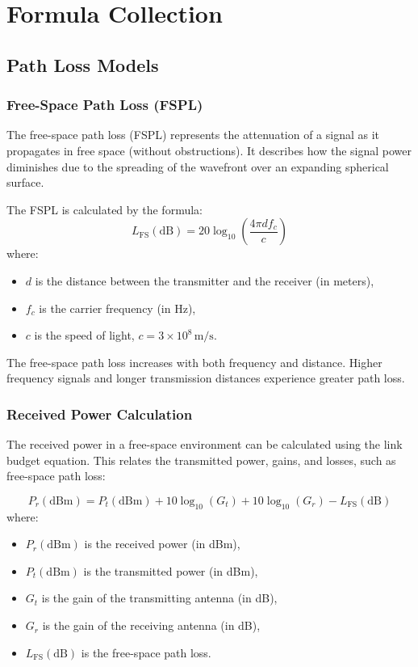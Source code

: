 \documentclass[a4paper,12pt]{book}
\begin{document}
	\chapter{Formula Collection}
	\section{Path Loss Models}
	
	\subsection{Free-Space Path Loss (FSPL)}
	The free-space path loss (FSPL) represents the attenuation of a signal as it propagates in free space (without obstructions). It describes how the signal power diminishes due to the spreading of the wavefront over an expanding spherical surface.
	
	The FSPL is calculated by the formula:
	\[
	L_{\text{FS}}(\text{dB}) = 20 \log_{10} \left( \frac{4\pi d f_c}{c} \right)
	\]
	where:
	\begin{itemize}
		\item \( d \) is the distance between the transmitter and the receiver (in meters),
		\item \( f_c \) is the carrier frequency (in Hz),
		\item \( c \) is the speed of light, \(c = 3 \times 10^8 \, \text{m/s}\).
	\end{itemize}
	
	The free-space path loss increases with both frequency and distance. Higher frequency signals and longer transmission distances experience greater path loss.
	
	\subsection{Received Power Calculation}
	
	The received power in a free-space environment can be calculated using the link budget equation. This relates the transmitted power, gains, and losses, such as free-space path loss:
	
	\[
	P_r (\text{dBm}) = P_t (\text{dBm}) + 10 \log_{10}(G_t) + 10 \log_{10}(G_r) - L_{\text{FS}} (\text{dB})
	\]
	where:
	\begin{itemize}
		\item \( P_r (\text{dBm}) \) is the received power (in dBm),
		\item \( P_t (\text{dBm}) \) is the transmitted power (in dBm),
		\item \( G_t \) is the gain of the transmitting antenna (in dB),
		\item \( G_r \) is the gain of the receiving antenna (in dB),
		\item \( L_{\text{FS}} (\text{dB}) \) is the free-space path loss.
	\end{itemize}
	
\end{document}
